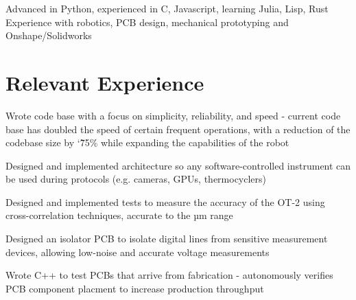 \documentclass[]{deedy-resume-openfont}
\begin{document}

\begin{minipage}[t]{\textwidth}
	 Advanced in Python, experienced in C, Javascript, learning Julia, Lisp, Rust\\
   Experience with robotics, PCB design, mechanical prototyping and Onshape/Solidworks
\end{minipage}

\vspace{12pt}

\section{Relevant Experience}

\begin{tightemize}
    \item Wrote code base with a focus on simplicity, reliability, and speed - current code base has doubled the speed of certain frequent operations, with a reduction of the codebase size by \char`\~ 75\% while expanding the capabilities of the robot
    \item Designed and implemented architecture so any software-controlled instrument can be used during protocols (e.g. cameras, GPUs, thermocyclers)
    \item Designed and implemented tests to measure the accuracy of the OT-2 using cross-correlation techniques, accurate to the µm range
\end{tightemize}

\vspace{8pt}

\begin{tightemize}
    \item Designed an isolator PCB to isolate digital lines from sensitive measurement devices, allowing low-noise and accurate voltage measurements
    \item Wrote C++ to test PCBs that arrive from fabrication - autonomously verifies PCB component placment to increase production throughput
\end{tightemize}
\end{document}
